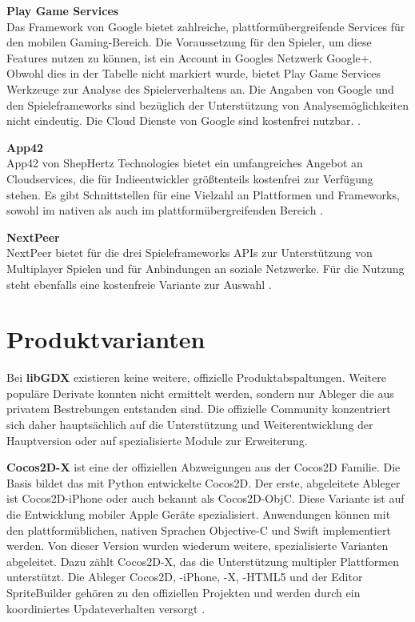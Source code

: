 \bigskip
\textbf{Play Game Services} \\
Das Framework von Google bietet zahlreiche, plattformübergreifende Services für den mobilen Gaming-Bereich. Die Voraussetzung für den Spieler, um diese Features nutzen zu können, ist ein Account in Googles Netzwerk Google+. Obwohl dies in der Tabelle nicht markiert wurde, bietet Play Game Services Werkzeuge zur Analyse des Spielerverhaltens an. Die Angaben von Google und den Spieleframeworks sind bezüglich der Unterstützung von Analysemöglichkeiten nicht eindeutig. Die Cloud Dienste von Google sind kostenfrei nutzbar. \citep{play_game_services}. 

\bigskip
\textbf{App42} \\
App42 von ShepHertz Technologies bietet ein umfangreiches Angebot an Cloudservices, die für Indieentwickler größtenteils kostenfrei zur Verfügung stehen. Es gibt Schnittstellen für eine Vielzahl an Plattformen und Frameworks, sowohl im nativen als auch im plattformübergreifenden Bereich \citep{app42}.

\bigskip
\textbf{NextPeer} \\
NextPeer bietet für die drei Spieleframeworks APIs zur Unterstützung von Multiplayer Spielen und für Anbindungen an soziale Netzwerke. Für die Nutzung steht ebenfalls eine kostenfreie Variante zur Auswahl \citep{nextpeer}.

\section{Produktvarianten}
Bei \textbf{libGDX} existieren keine weitere, offizielle Produktabspaltungen. Weitere populäre Derivate konnten nicht ermittelt werden, sondern nur Ableger die aus privatem Bestrebungen entstanden sind. Die offizielle Community konzentriert sich daher hauptsächlich auf die Unterstützung und Weiterentwicklung der Hauptversion oder auf spezialisierte Module zur Erweiterung.

\bigskip
\textbf{Cocos2D-X} ist eine der offiziellen Abzweigungen aus der Cocos2D Familie. Die Basis bildet das mit Python entwickelte Cocos2D. Der erste, abgeleitete Ableger ist Cocos2D-iPhone oder auch bekannt als Cocos2D-ObjC. Diese Variante ist auf die Entwicklung mobiler Apple Geräte spezialisiert. Anwendungen können mit den plattformüblichen, nativen Sprachen Objective-C und Swift implementiert werden. Von dieser Version wurden wiederum weitere, spezialisierte Varianten abgeleitet. Dazu zählt Cocos2D-X, das die Unterstützung multipler Plattformen unterstützt. Die Ableger Cocos2D, -iPhone, -X, -HTML5 und der Editor SpriteBuilder gehören zu den offiziellen Projekten und werden durch ein koordiniertes Updateverhalten versorgt \citep{cocos2d_relationships}. 

